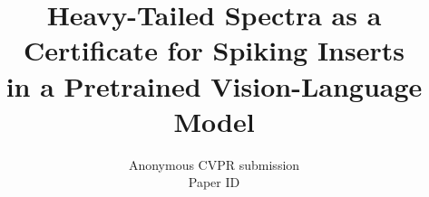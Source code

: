 \documentclass[10pt,twocolumn,letterpaper]{article}
\title{Heavy-Tailed Spectra as a Certificate for Spiking Inserts\\ in a Pretrained Vision-Language Model}
\author{Anonymous CVPR submission\\
Paper ID \paperID}
\begin{document}
\maketitle






{
    \small
    
    
}
\end{document}
